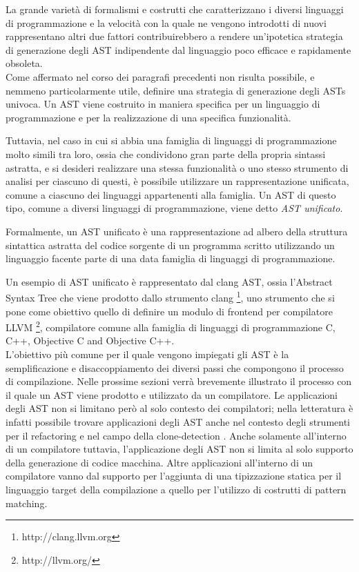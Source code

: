 La grande varietà di formalismi e costrutti che caratterizzano i diversi
linguaggi di programmazione e la velocità con la quale ne vengono introdotti di
nuovi rappresentano altri due fattori contribuirebbero a rendere un'ipotetica
strategia di generazione degli AST indipendente dal linguaggio poco efficace e
rapidamente obsoleta.\\

Come affermato nel corso dei paragrafi precedenti non risulta possibile, e
nemmeno particolarmente utile, definire una strategia di generazione degli ASTs
univoca. Un AST viene costruito in maniera specifica per un linguaggio di
programmazione e per la realizzazione di una specifica funzionalità.

Tuttavia, nel caso in cui si abbia una famiglia di linguaggi di programmazione
molto simili tra loro, ossia che condividono gran parte della propria sintassi
astratta, e si desideri realizzare una stessa funzionalità o uno stesso
strumento di analisi per ciascuno di questi, è possibile utilizzare un
rappresentazione unificata, comune a ciascuno dei linguaggi appartenenti alla
famiglia. Un AST di questo tipo, comune a diversi linguaggi di programmazione,
viene detto \textit{AST unificato}.

Formalmente, un AST unificato è una rappresentazione ad albero della struttura
sintattica astratta del codice sorgente di un programma scritto utilizzando un
linguaggio facente parte di una data famiglia di linguaggi di programmazione.

Un esempio di AST unificato è rappresentato dal clang AST, ossia l’Abstract
Syntax Tree che viene prodotto dallo strumento clang \footnote
{http://clang.llvm.org}, uno strumento che si pone come obiettivo quello di
definire un modulo di frontend per compilatore LLVM \footnote{http://llvm.org/},
compilatore comune alla famiglia di linguaggi di programmazione C, C++,
Objective C and Objective C++. \cite{DBLP:conf/lcpc/LattnerA04}\\

L’obiettivo più comune per il quale vengono impiegati gli AST è la
semplificazione e disaccoppiamento dei diversi passi che compongono il processo
di compilazione. Nelle prossime sezioni verrà brevemente illustrato il processo
con il quale un AST viene prodotto e utilizzato da un compilatore. Le
applicazioni degli AST non si limitano però al solo contesto dei compilatori;
nella letteratura è infatti possibile trovare applicazioni degli AST anche nel
contesto degli strumenti per il refactoring \cite{jscodeshift2016} e nel campo
della clone-detection \cite{DBLP:conf/saci/LazarB14}. Anche solamente
all’interno di un compilatore tuttavia, l’applicazione degli AST non si limita
al solo supporto della generazione di codice macchina. Altre applicazioni
all’interno di un compilatore vanno dal supporto per l'aggiunta di una
tipizzazione statica per il linguaggio target della compilazione a quello per
l'utilizzo di costrutti di pattern matching.\\

